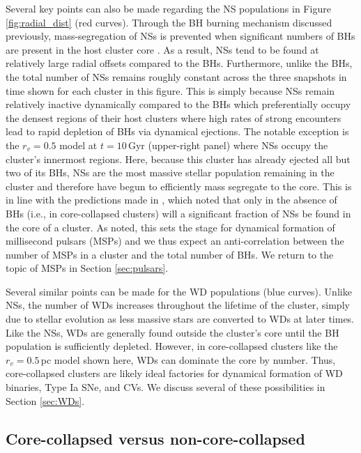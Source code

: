 \documentclass[twocolumn,tighten]{aastex63}
\begin{document}
Several key points can also be made regarding the NS populations in Figure \ref{fig:radial_dist} (red curves). Through the BH burning mechanism discussed previously, mass-segregation of NSs is prevented when significant numbers of BHs are present in the host cluster core \citep[e.g.,][]{Ye2018,Fragione2018a,Banerjee2018}. As a result, NSs tend to be found at relatively large radial offsets compared to the BHs. Furthermore, unlike the BHs, the total number of NSs remains roughly constant across the three snapshots in time shown for each cluster in this figure.
This is simply because NSs remain relatively inactive dynamically compared to the BHs which preferentially occupy the densest regions of their host clusters where high rates of strong encounters lead to rapid depletion of BHs via dynamical ejections.
The notable exception is the $r_v=0.5$ model at $t=10\,$Gyr (upper-right panel) where NSs occupy the cluster's innermost regions. Here, because this cluster has already ejected all but two of its BHs, NSs are the most massive stellar population remaining in the cluster and therefore have begun to efficiently mass segregate to the core. This is in line with the predictions made in \citet{Ye2018}, which noted that only in the absence of BHs (i.e., in core-collapsed clusters) will a significant fraction of NSs be found in the core of a cluster. As \citet{Ye2018} noted, this sets the stage for dynamical formation of millisecond pulsars (MSPs) and we thus expect an anti-correlation between the number of MSPs in a cluster and the total number of BHs. We return to the topic of MSPs in Section \ref{sec:pulsars}.

Several similar points can be made for the WD populations (blue curves). Unlike NSs, the number of WDs increases throughout the lifetime of the cluster, simply due to stellar evolution as less massive stars are converted to WDs at later times. Like the NSs, WDs are generally found outside the cluster's core until the BH population is sufficiently depleted. However, in core-collapsed clusters like the $r_v=0.5\,$pc model shown here, WDs can dominate the core by number. Thus, core-collapsed clusters are likely ideal factories for dynamical formation of WD binaries, Type Ia SNe, and CVs. We discuss several of these possibilities in Section \ref{sec:WDs}.

\subsection{Core-collapsed versus non-core-collapsed}
\label{sec:corecollapse}
\end{document}
